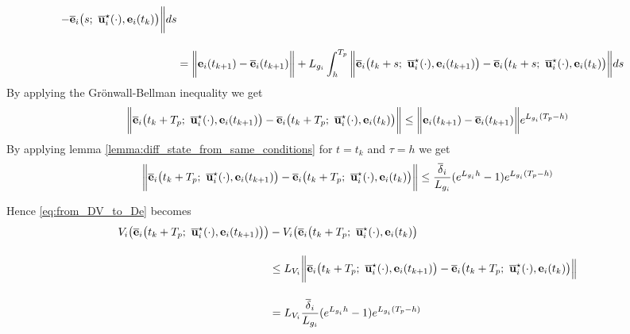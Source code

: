 \begin{gg_box}
\begin{alignat}{2}
  - \overline{\vect{e}}_i\big(s;\ \overline{\vect{u}}_i^{\star}(\cdot), \vect{e}_i(t_k)\big) \bigg\| ds \\[2.5ex]
  &= \bigg \| \vect{e}_i(t_{k+1}) - \overline{\vect{e}}_i(t_{k+1}) \bigg\|
  +  L_{g_i} \int_{h}^{T_p} \bigg\| \overline{\vect{e}}_i\big(t_k + s;\ \overline{\vect{u}}_i^{\star}(\cdot), \vect{e}_i(t_{k+1})\big)
  - \overline{\vect{e}}_i\big(t_k + s;\ \overline{\vect{u}}_i^{\star}(\cdot), \vect{e}_i(t_k)\big) \bigg\| ds
\end{alignat}
By applying the  Gr\"{o}nwall-Bellman inequality we get
\begin{alignat}{2}
  \bigg \|\overline{\vect{e}}_i\big(t_k + T_p;\ \overline{\vect{u}}_i^{\star}(\cdot), \vect{e}_i(t_{k+1})\big)
    - \overline{\vect{e}}_i\big(t_k + T_p;\ \overline{\vect{u}}_i^{\star}(\cdot), \vect{e}_i(t_k)\big) \bigg\|
    \leq \bigg \| \vect{e}_i(t_{k+1}) - \overline{\vect{e}}_i(t_{k+1}) \bigg\| e^{L_{g_i} (T_p - h)}
\end{alignat}
By applying lemma \eqref{lemma:diff_state_from_same_conditions} for $t = t_k$ and
$\tau = h$ we get
\begin{alignat}{2}
  \bigg \|\overline{\vect{e}}_i\big(t_k + T_p;\ \overline{\vect{u}}_i^{\star}(\cdot), \vect{e}_i(t_{k+1})\big)
    - \overline{\vect{e}}_i\big(t_k + T_p;\ \overline{\vect{u}}_i^{\star}(\cdot), \vect{e}_i(t_k)\big) \bigg\|
    \leq \dfrac{\overline{\delta}_i}{L_{g_i}} (e^{L_{g_i}h} - 1) e^{L_{g_i} (T_p - h)}
\end{alignat}

Hence \eqref{eq:from_DV_to_De} becomes
\begin{align}
  V_i\big(\overline{\vect{e}}_i\big(t_k + T_p;\ \overline{\vect{u}}_i^{\star}(\cdot), \vect{e}_i(t_{k+1})\big)\big)
    &- V_i\big(\overline{\vect{e}}_i\big(t_k + T_p;\ \overline{\vect{u}}_i^{\star}(\cdot), \vect{e}_i(t_k)\big) \\[2.5ex]
  &\leq L_{V_i}\bigg \| \overline{\vect{e}}_i\big(t_k + T_p;\ \overline{\vect{u}}_i^{\star}(\cdot), \vect{e}_i(t_{k+1})\big)
    - \overline{\vect{e}}_i\big(t_k + T_p;\ \overline{\vect{u}}_i^{\star}(\cdot), \vect{e}_i(t_k) \big)\Big\| \\[2.5ex]
  &= L_{V_i} \dfrac{\overline{\delta}_i}{L_{g_i}} (e^{L_{g_i}h} - 1) e^{L_{g_i} (T_p - h)}
\label{eq:from_DV_to_eq}
\end{align}


\end{gg_box}
